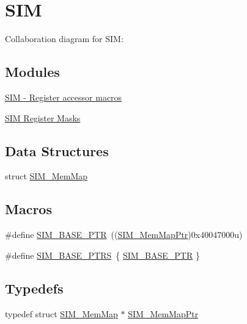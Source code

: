 \hypertarget{group___s_i_m___peripheral}{}\section{S\+IM}
\label{group___s_i_m___peripheral}
Collaboration diagram for S\+IM\+:
\subsection*{Modules}
\begin{DoxyCompactItemize}
\item 
\hyperlink{group___s_i_m___register___accessor___macros}{S\+I\+M -\/ Register accessor macros}
\item 
\hyperlink{group___s_i_m___register___masks}{S\+I\+M Register Masks}
\end{DoxyCompactItemize}
\subsection*{Data Structures}
\begin{DoxyCompactItemize}
\item 
struct \hyperlink{struct_s_i_m___mem_map}{S\+I\+M\+\_\+\+Mem\+Map}
\end{DoxyCompactItemize}
\subsection*{Macros}
\begin{DoxyCompactItemize}
\item 
\#define \hyperlink{group___s_i_m___peripheral_ga719ec5df95fbb5732438f794f2cccf3c}{S\+I\+M\+\_\+\+B\+A\+S\+E\+\_\+\+P\+TR}~((\hyperlink{group___s_i_m___peripheral_ga708a122e8ca55082e0cf67cab6a77d02}{S\+I\+M\+\_\+\+Mem\+Map\+Ptr})0x40047000u)
\item 
\#define \hyperlink{group___s_i_m___peripheral_ga2fd213a3b9fc7d761ab0cdeb74c34f91}{S\+I\+M\+\_\+\+B\+A\+S\+E\+\_\+\+P\+T\+RS}~\{ \hyperlink{group___s_i_m___peripheral_ga719ec5df95fbb5732438f794f2cccf3c}{S\+I\+M\+\_\+\+B\+A\+S\+E\+\_\+\+P\+TR} \}
\end{DoxyCompactItemize}
\subsection*{Typedefs}
\begin{DoxyCompactItemize}
\item 
typedef struct \hyperlink{struct_s_i_m___mem_map}{S\+I\+M\+\_\+\+Mem\+Map} $\ast$ \hyperlink{group___s_i_m___peripheral_ga708a122e8ca55082e0cf67cab6a77d02}{S\+I\+M\+\_\+\+Mem\+Map\+Ptr}
\end{DoxyCompactItemize}


